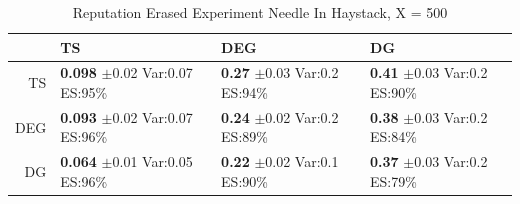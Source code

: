 \documentclass[11pt,letterpaper]{article}
\begin{document}
\begin{table}[ht]
\centering
\caption{Reputation Erased Experiment Needle In Haystack, X = 500} 
\begin{tabular}{rlll}
  \hline
 & TS & DEG &  DG \\ 
  \hline
TS & \makecell{\textbf{0.098} $\pm$0.02\\Var:0.07\\ES:95\%} & \makecell{\textbf{0.27} $\pm$0.03\\Var:0.2\\ES:94\%} & \makecell{\textbf{0.41} $\pm$0.03\\Var:0.2\\ES:90\%} \\ 
  DEG & \makecell{\textbf{0.093} $\pm$0.02\\Var:0.07\\ES:96\%} & \makecell{\textbf{0.24} $\pm$0.02\\Var:0.2\\ES:89\%} & \makecell{\textbf{0.38} $\pm$0.03\\Var:0.2\\ES:84\%} \\ 
   DG & \makecell{\textbf{0.064} $\pm$0.01\\Var:0.05\\ES:96\%} & \makecell{\textbf{0.22} $\pm$0.02\\Var:0.1\\ES:90\%} & \makecell{\textbf{0.37} $\pm$0.03\\Var:0.2\\ES:79\%} \\ 
   \hline
\end{tabular}
\end{table}
\end{document}

